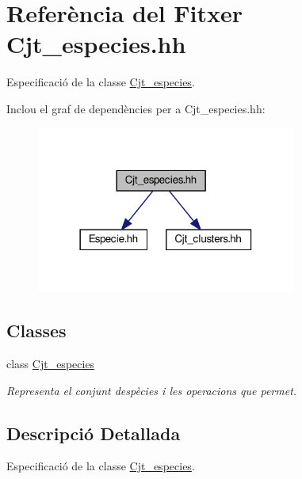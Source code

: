 \hypertarget{_cjt__especies_8hh}{}\section{Referència del Fitxer Cjt\+\_\+especies.\+hh}
\label{_cjt__especies_8hh}


Especificació de la classe \hyperlink{class_cjt__especies}{Cjt\+\_\+especies}.  


Inclou el graf de dependències per a Cjt\+\_\+especies.\+hh\+:
\nopagebreak
\begin{figure}[H]
\begin{center}
\leavevmode
\includegraphics[width=242pt]{_cjt__especies_8hh__incl}
\end{center}
\end{figure}
\subsection*{Classes}
\begin{DoxyCompactItemize}
\item 
class \hyperlink{class_cjt__especies}{Cjt\+\_\+especies}
\begin{DoxyCompactList}\small\item\em Representa el conjunt d\textquotesingle{}espècies i les operacions que permet. \end{DoxyCompactList}\end{DoxyCompactItemize}


\subsection{Descripció Detallada}
Especificació de la classe \hyperlink{class_cjt__especies}{Cjt\+\_\+especies}. 

